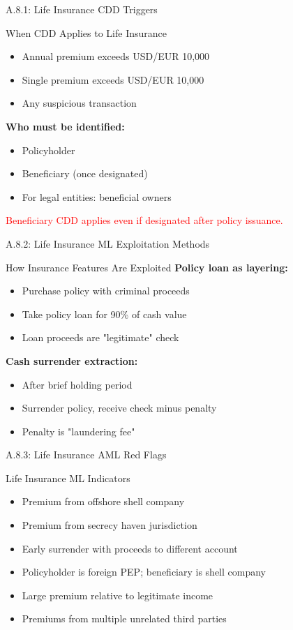 \documentclass{beamer}
\begin{document}
	\begin{frame}{A.8.1: Life Insurance CDD Triggers}
		\begin{block}{When CDD Applies to Life Insurance}
			\begin{itemize}
				\item Annual premium exceeds USD/EUR 10,000
				\item Single premium exceeds USD/EUR 10,000
				\item Any suspicious transaction
			\end{itemize}
			\textbf{Who must be identified:}
			\begin{itemize}
				\item Policyholder
				\item Beneficiary (once designated)
				\item For legal entities: beneficial owners
			\end{itemize}
		\end{block}
		\textcolor{red}{Beneficiary CDD applies even if designated after policy issuance.}
	\end{frame}
	
	\begin{frame}{A.8.2: Life Insurance ML Exploitation Methods}
		\begin{block}{How Insurance Features Are Exploited}
			\textbf{Policy loan as layering:}
			\begin{itemize}
				\item Purchase policy with criminal proceeds
				\item Take policy loan for 90\% of cash value
				\item Loan proceeds are "legitimate" check
			\end{itemize}
			\textbf{Cash surrender extraction:}
			\begin{itemize}
				\item After brief holding period
				\item Surrender policy, receive check minus penalty
				\item Penalty is "laundering fee"
			\end{itemize}
		\end{block}
	\end{frame}
	
	\begin{frame}{A.8.3: Life Insurance AML Red Flags}
		\begin{block}{Life Insurance ML Indicators}
			\begin{itemize}
				\item Premium from offshore shell company
				\item Premium from secrecy haven jurisdiction
				\item Early surrender with proceeds to different account
				\item Policyholder is foreign PEP; beneficiary is shell company
				\item Large premium relative to legitimate income
				\item Premiums from multiple unrelated third parties
			\end{itemize}
		\end{block}
	\end{frame}
	
\end{document}

